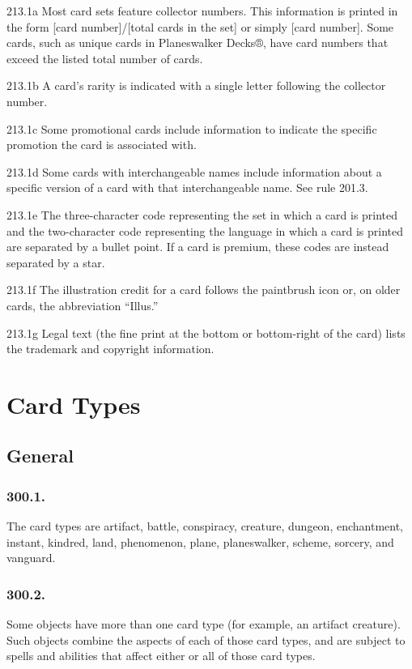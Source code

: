 213.1a Most card sets feature collector numbers. This information is printed in the form [card number]/[total cards in the set] or simply [card number]. Some cards, such as unique cards in Planeswalker Decks®, have card numbers that exceed the listed total number of cards.

213.1b A card’s rarity is indicated with a single letter following the collector number.

213.1c Some promotional cards include information to indicate the specific promotion the card is associated with.

213.1d Some cards with interchangeable names include information about a specific version of a card with that interchangeable name. See rule 201.3.

213.1e The three-character code representing the set in which a card is printed and the two-character code representing the language in which a card is printed are separated by a bullet point. If a card is premium, these codes are instead separated by a star.

213.1f The illustration credit for a card follows the paintbrush icon or, on older cards, the abbreviation “Illus.”

213.1g Legal text (the fine print at the bottom or bottom-right of the card) lists the trademark and copyright information.

\chapter{Card Types}
\setcounter{section}{299}
\section{General}
\subsection*{300.1.}
The card types are artifact, battle, conspiracy, creature, dungeon, enchantment, instant, kindred, land, phenomenon, plane, planeswalker, scheme, sorcery, and vanguard.

\subsection*{300.2.}
Some objects have more than one card type (for example, an artifact creature). Such objects combine the aspects of each of those card types, and are subject to spells and abilities that affect either or all of those card types.

